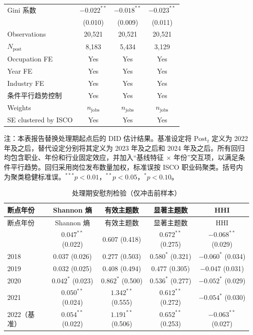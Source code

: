 \documentclass[12pt, a4paper]{article}
\begin{document}
\begin{longtable}{lccc}
Gini 系数
  & $-0.022^{**}$  & $-0.018^{**}$  & $-0.023^{**}$  \\
  & (0.010)        & (0.009)        & (0.011)        \\[4pt]
\midrule
Observations       & 20{,}521 & 20{,}521 & 20{,}521 \\
$N_{\text{post}}$  & 8{,}183  & 5{,}434  & 3{,}129  \\
Occupation FE      & Yes    & Yes    & Yes    \\
Year FE            & Yes    & Yes    & Yes    \\
Industry FE        & Yes    & Yes    & Yes    \\
条件平行趋势控制 & Yes & Yes  & Yes    \\
Weights            & $n_{\text{jobs}}$ & $n_{\text{jobs}}$ & $n_{\text{jobs}}$ \\
SE clustered by ISCO & Yes  & Yes    & Yes    \\
\end{longtable}

\noindent 注：本表报告替换处理期起点后的 DID 估计结果。基准设定将 $\text{Post}_t$ 定义为 2022 年及之后，替代设定分别将其定义为 2023 年及之后和 2024 年及之后。所有回归均包含职业、年份和行业固定效应，并加入“基线特征 $\times$ 年份”交互项，以满足条件平行趋势。回归采用岗位发布数量加权，标准误按 ISCO 职业码聚类。括号内为聚类稳健标准误。$^{***}p<0.01$，$^{**}p<0.05$，$^{*}p<0.10$。

\bigskip

\begin{longtable}{lcccc}
\caption{处理期安慰剂检验（仅冲击前样本）}\label{tab:app_placebo_timing} \\
\toprule
断点年份 & Shannon 熵 & 有效主题数 & 显著主题数 & HHI \\
\midrule
\endfirsthead
\toprule
断点年份 & Shannon 熵 & 有效主题数 & 显著主题数 & HHI \\
\midrule
\endhead
\bottomrule
\endfoot
2017 & $0.047^{**}$ (0.022) & $0.607$ (0.418) & $0.672^{**}$ (0.275) & $-0.068^{**}$ (0.029) \\
2018 & $0.037$ (0.026) & $0.277$ (0.503) & $0.580^{*}$ (0.321) & $-0.060^{*}$ (0.034) \\
2019 & $0.032$ (0.025) & $0.408$ (0.494) & $0.477$ (0.305) & $-0.047$ (0.031) \\
2020 & $0.042^{*}$ (0.023) & $0.862^{*}$ (0.500) & $0.536^{*}$ (0.277) & $-0.052^{*}$ (0.029) \\
2021 & $0.050^{**}$ (0.024) & $1.342^{**}$ (0.555) & $0.612^{**}$ (0.272) & $-0.054^{*}$ (0.030) \\
\midrule
2022（基准） & $0.054^{**}$ (0.022) & $1.191^{**}$ (0.506) & $0.652^{**}$ (0.253) & $-0.063^{**}$ (0.027) \\
\end{longtable}
\end{document}
